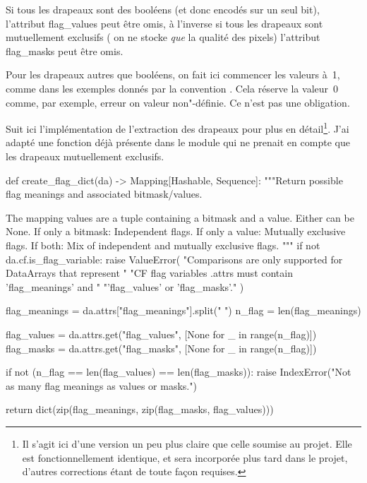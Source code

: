 \begin{note}
  Si tous les drapeaux sont des booléens (et donc encodés sur un seul bit), l'attribut \textsf{flag\_values} peut être omis, à l'inverse si tous les drapeaux sont mutuellement exclusifs ( on ne stocke \emph{que} la qualité des pixels) l'attribut \textsf{flag\_masks} peut être omis.
\end{note}
\begin{note}
  Pour les drapeaux autres que booléens, on fait ici commencer les valeurs à~1, comme dans les exemples donnés par la convention . Cela réserve la valeur~0 comme, par exemple, erreur on valeur non"-définie. Ce n'est pas une obligation.
\end{note}

Suit ici l'implémentation de l'extraction des drapeaux pour  plus en détail\footnote{Il s'agit ici d'une version un peu plus claire que celle soumise au projet. Elle est fonctionnellement identique, et sera incorporée plus tard dans le projet, d'autres corrections étant de toute façon requises.}.
J'ai adapté une fonction déjà présente dans le module qui ne prenait en compte que les drapeaux mutuellement exclusifs.
\begin{python}
def create_flag_dict(da) -> Mapping[Hashable, Sequence]:
    """Return possible flag meanings and associated bitmask/values.

    The mapping values are a tuple containing a bitmask and a value.
    Either can be None.
    If only a bitmask: Independent flags.
    If only a value: Mutually exclusive flags.
    If both: Mix of independent and mutually exclusive flags.
    """
    if not da.cf.is_flag_variable:
        raise ValueError(
            "Comparisons are only supported for DataArrays that represent "
            "CF flag variables .attrs must contain 'flag_meanings' and "
            "'flag_values' or 'flag_masks'."
        )

    flag_meanings = da.attrs["flag_meanings"].split(" ")
    n_flag = len(flag_meanings)

    flag_values = da.attrs.get("flag_values", [None for _ in range(n_flag)])
    flag_masks = da.attrs.get("flag_masks", [None for _ in range(n_flag)])

    if not (n_flag == len(flag_values) == len(flag_masks)):
        raise IndexError("Not as many flag meanings as values or masks.")

    return dict(zip(flag_meanings, zip(flag_masks, flag_values)))
\end{python}

